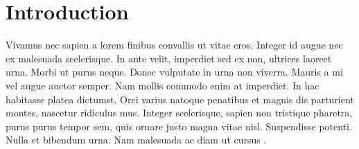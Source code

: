 \section{Introduction}

Vivamus nec sapien a lorem finibus convallis ut vitae eros. Integer id augue nec ex malesuada scelerisque. In ante velit, imperdiet sed ex non, ultrices laoreet urna. Morbi ut purus neque. Donec vulputate in urna non viverra. Mauris a mi vel augue auctor semper. Nam mollis commodo enim at imperdiet. In hac habitasse platea dictumst. Orci varius natoque penatibus et magnis dis parturient montes, nascetur ridiculus mus. Integer scelerisque, sapien non tristique pharetra, purus purus tempor sem, quis ornare justo magna vitae nisl. Suspendisse potenti. Nulla et bibendum urna. Nam malesuada ac diam ut cursus \cite{lipsum}.
